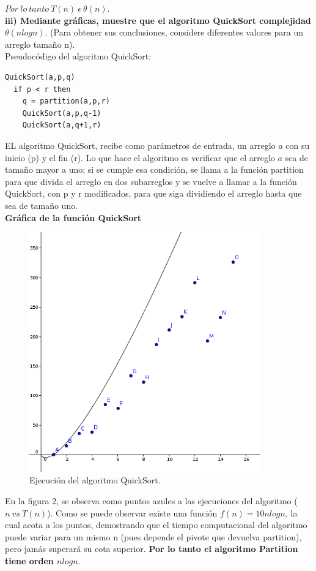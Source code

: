 \documentclass[12pt]{report}
\begin{document}
	$Por \ lo \ tanto \ T(n) \  \epsilon \ \theta (n).$\\
	
	\textbf{iii) Mediante gráficas, muestre que el algoritmo QuickSort complejidad $\theta (nlogn)$}. (Para obtener sus conclusiones, considere diferentes valores para un arreglo tamaño n).\\
	
	Pseudocódigo del algoritmo QuickSort:
	\lstset{language=C, breaklines=true, basicstyle=\footnotesize}
	\lstset{numbers=left, numberstyle=\tiny, stepnumber=1, numbersep=10pt}
	\begin{lstlisting}
QuickSort(a,p,q)
  if p < r then
    q = partition(a,p,r)
    QuickSort(a,p,q-1)
    QuickSort(a,q+1,r)
	\end{lstlisting}
	
	EL algoritmo QuickSort, recibe como parámetros de entrada, un arreglo $a$ con su inicio (p) y el fin (r). Lo que hace el algoritmo es verificar que el arreglo $a$ sea de tamaño mayor a uno; si se cumple esa condición, se llama a la función partition para que divida el arreglo en dos subarreglos y se vuelve a llamar a la función QuickSort, con p y r modificados, para que siga dividiendo el arreglo hasta que sea de tamaño uno.\\
	
	\textbf{Gráfica de la función QuickSort\\}
	\begin{figure}[H]
		\includegraphics[width=10cm]{imagenes/2.png}
		\centering
		\caption{Ejecución del algoritmo QuickSort.}
		\centering
	\end{figure}
	En la figura 2, se observa como puntos azules a las ejecuciones del algoritmo ($n \ vs \ T(n)$). Como se puede observar existe una función $f(n) = 10n logn$, la cual acota a los puntos, demostrando que el tiempo computacional del algoritmo puede variar para un mismo n (pues depende el pivote que devuelva partition), pero jamás superará su cota superior. \textbf{Por lo tanto el algoritmo Partition tiene orden $nlogn$}.\newpage
	
\end{document}
